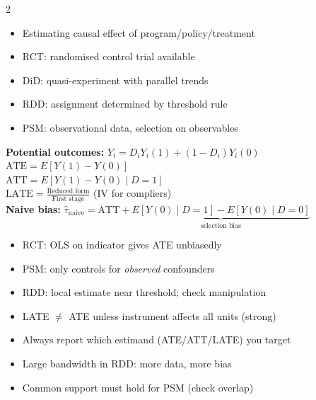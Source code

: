 \documentclass[10pt,a4paper]{article}
\begin{document}
\begin{multicols}{2}

\begin{tcolorbox}[when]
\begin{itemize}
  \item Estimating causal effect of program/policy/treatment
  \item RCT: randomised control trial available
  \item DiD: quasi-experiment with parallel trends
  \item RDD: assignment determined by threshold rule
  \item PSM: observational data, selection on observables
\end{itemize}
\end{tcolorbox}

\begin{tcolorbox}[key]
\textbf{Potential outcomes:} $Y_i = D_i Y_i(1) + (1-D_i) Y_i(0)$\\[3pt]
$\text{ATE} = E[Y(1) - Y(0)]$\\
$\text{ATT} = E[Y(1) - Y(0) \mid D=1]$\\
$\text{LATE} = \frac{\text{Reduced form}}{\text{First stage}}$ (IV for compliers)\\[3pt]
\textbf{Naive bias:} $\hat\tau_{\text{naive}} = \text{ATT} + \underbrace{E[Y(0)\mid D\!=\!1] - E[Y(0)\mid D\!=\!0]}_{\text{selection bias}}$
\end{tcolorbox}

\columnbreak

\begin{tcolorbox}[watchout]
\begin{itemize}
  \item RCT: OLS on indicator gives ATE unbiasedly
  \item PSM: only controls for \textit{observed} confounders
  \item RDD: local estimate near threshold; check manipulation
  \item LATE $\neq$ ATE unless instrument affects all units (strong)
  \item Always report which estimand (ATE/ATT/LATE) you target
  \item Large bandwidth in RDD: more data, more bias
  \item Common support must hold for PSM (check overlap)
\end{itemize}
\end{tcolorbox}

\end{multicols}
\end{document}
